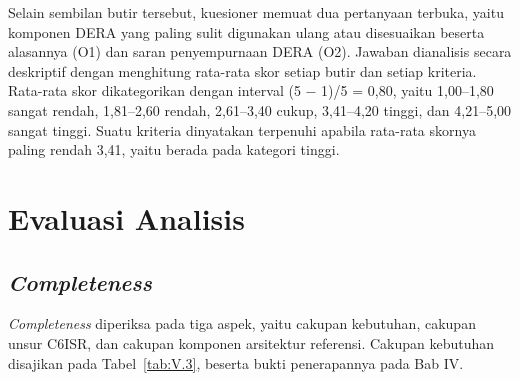 Selain sembilan butir tersebut, kuesioner memuat dua pertanyaan terbuka, yaitu komponen DERA yang paling sulit digunakan ulang atau disesuaikan beserta alasannya (O1) dan saran penyempurnaan DERA (O2). Jawaban dianalisis secara deskriptif dengan menghitung rata-rata skor setiap butir dan setiap kriteria. Rata-rata skor dikategorikan dengan interval (5 − 1)/5 = 0,80, yaitu 1,00–1,80 sangat rendah, 1,81–2,60 rendah, 2,61–3,40 cukup, 3,41–4,20 tinggi, dan 4,21–5,00 sangat tinggi. Suatu kriteria dinyatakan terpenuhi apabila rata-rata skornya paling rendah 3,41, yaitu berada pada kategori tinggi.

\section{Evaluasi Analisis}
\label{sec:V.2}

\subsection{\textit{Completeness}}
\label{sec:V.2.1}

\textit{Completeness} diperiksa pada tiga aspek, yaitu cakupan kebutuhan, cakupan unsur C6ISR, dan cakupan komponen arsitektur referensi. Cakupan kebutuhan disajikan pada Tabel~\ref{tab:V.3}, beserta bukti penerapannya pada Bab IV.

